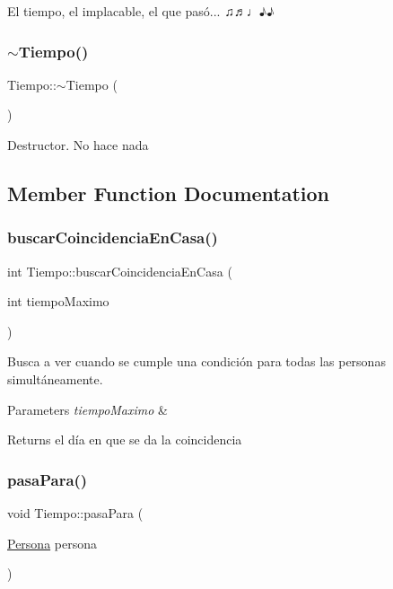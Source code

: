 El tiempo, el implacable, el que pasó... ♫♬♩♪♪ \mbox{\label{classTiempo_a39166529f35612f25e2f511680e0be6f}} 
\subsubsection{\texorpdfstring{$\sim$\+Tiempo()}{~Tiempo()}}
{\footnotesize\ttfamily Tiempo\+::$\sim$\+Tiempo (\begin{DoxyParamCaption}{ }\end{DoxyParamCaption})}

Destructor. No hace nada 

\subsection{Member Function Documentation}
\mbox{\label{classTiempo_a9e8e384ecf22079bb34d2fbc39ff24b3}} 
\subsubsection{\texorpdfstring{buscar\+Coincidencia\+En\+Casa()}{buscarCoincidenciaEnCasa()}}
{\footnotesize\ttfamily int Tiempo\+::buscar\+Coincidencia\+En\+Casa (\begin{DoxyParamCaption}\item[{int}]{tiempo\+Maximo }\end{DoxyParamCaption})}

Busca a ver cuando se cumple una condición para todas las personas simultáneamente. 
\begin{DoxyParams}{Parameters}
{\em tiempo\+Maximo} & \\
\hline
\end{DoxyParams}
\begin{DoxyReturn}{Returns}
el día en que se da la coincidencia 
\end{DoxyReturn}
\mbox{\label{classTiempo_a843c070849caac4ff5122c4747bdd44e}} 
\subsubsection{\texorpdfstring{pasa\+Para()}{pasaPara()}}
{\footnotesize\ttfamily void Tiempo\+::pasa\+Para (\begin{DoxyParamCaption}\item[{\hyperlink{classPersona}{Persona}}]{persona }\end{DoxyParamCaption})}

